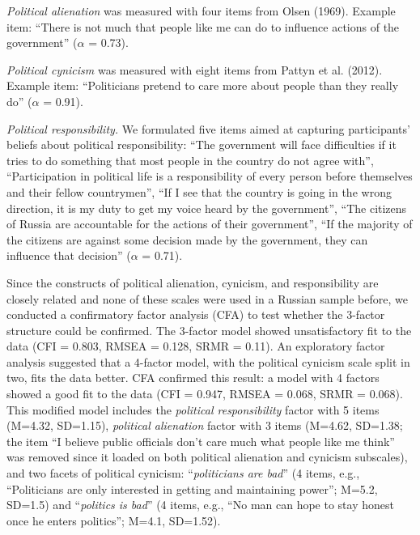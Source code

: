 \documentclass[
]{article}
\begin{document}
\emph{Political alienation} was measured with four items from Olsen (1969). Example item: ``There is not much that people like me can do to influence actions of the government'' (\(\alpha\) = 0.73).

\emph{Political cynicism} was measured with eight items from Pattyn et al. (2012). Example item: ``Politicians pretend to care more about people than they really do'' (\(\alpha\) = 0.91).

\emph{Political responsibility.} We formulated five items aimed at capturing participants' beliefs about political responsibility: ``The government will face difficulties if it tries to do something that most people in the country do not agree with'', ``Participation in political life is a responsibility of every person before themselves and their fellow countrymen'', ``If I see that the country is going in the wrong direction, it is my duty to get my voice heard by the government'', ``The citizens of Russia are accountable for the actions of their government'', ``If the majority of the citizens are against some decision made by the government, they can influence that decision'' (\(\alpha\) = 0.71).

Since the constructs of political alienation, cynicism, and responsibility are closely related and none of these scales were used in a Russian sample before, we conducted a confirmatory factor analysis (CFA) to test whether the 3-factor structure could be confirmed. The 3-factor model showed unsatisfactory fit to the data (CFI = 0.803, RMSEA = 0.128, SRMR = 0.11). An exploratory factor analysis suggested that a 4-factor model, with the political cynicism scale split in two, fits the data better. CFA confirmed this result: a model with 4 factors showed a good fit to the data (CFI = 0.947, RMSEA = 0.068, SRMR = 0.068). This modified model includes the \emph{political responsibility} factor with 5 items (M=4.32, SD=1.15), \emph{political alienation} factor with 3 items (M=4.62, SD=1.38; the item ``I believe public officials don't care much what people like me think'' was removed since it loaded on both political alienation and cynicism subscales), and two facets of political cynicism: ``\emph{politicians are bad}'' (4 items, e.g., ``Politicians are only interested in getting and maintaining power''; M=5.2, SD=1.5) and ``\emph{politics is bad}'' (4 items, e.g., ``No man can hope to stay honest once he enters politics''; M=4.1, SD=1.52).
\end{document}
